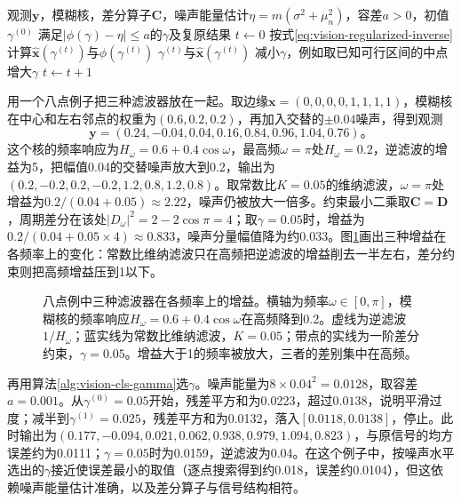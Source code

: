 \begin{algorithm}[约束最小二乘滤波的参数选择]
 \label{alg:vision-cls-gamma}
 \begin{algorithmic}[1]
  \Require 观测$\bm{y}$，模糊核，差分算子$\bm{C}$，噪声能量估计$\eta=m(\sigma^2+\mu_n^2)$，容差$a>0$，初值$\gamma^{(0)}$
  \Ensure 满足$|\phi(\gamma)-\eta|\leq a$的$\gamma$及复原结果
  \State $t\gets0$
  \Loop
   \State 按式\eqref{eq:vision-regularized-inverse}计算$\widehat{\bm{x}}(\gamma^{(t)})$与$\phi(\gamma^{(t)})$
    \State \Return $\gamma^{(t)}$与$\widehat{\bm{x}}(\gamma^{(t)})$
    \State 减小$\gamma$，例如取已知可行区间的中点 
   \Else
    \State 增大$\gamma$ 
   \EndIf
   \State $t\gets t+1$
  \EndLoop
 \end{algorithmic}
\end{algorithm}

用一个八点例子把三种滤波器放在一起。取边缘$\bm{x}=(0,0,0,0,1,1,1,1)$，模糊核在中心和左右邻点的权重为$(0.6,0.2,0.2)$，再加入交替的$\pm0.04$噪声，得到观测
\[
 \bm{y}=(0.24,-0.04,0.04,0.16,0.84,0.96,1.04,0.76)\text{。}
\]
这个核的频率响应为$H_\omega=0.6+0.4\cos\omega$，最高频$\omega=\pi$处$H_\omega=0.2$，逆滤波的增益为5，把幅值0.04的交替噪声放大到0.2，输出为$(0.2,-0.2,0.2,-0.2,1.2,0.8,1.2,0.8)$。取常数比$K=0.05$的维纳滤波，$\omega=\pi$处增益为$0.2/(0.04+0.05)\approx2.22$，噪声仍被放大一倍多。约束最小二乘取$\bm{C}=\bm{D}$，周期差分在该处$|D_\omega|^2=2-2\cos\pi=4$；取$\gamma=0.05$时，增益为$0.2/(0.04+0.05\times4)\approx0.833$，噪声分量幅值降为约0.033。图\ref{fig:vision-filter-gains}画出三种增益在各频率上的变化：常数比维纳滤波只在高频把逆滤波的增益削去一半左右，差分约束则把高频增益压到1以下。

\begin{figure}[htbp]
 \centering
 
 \caption{八点例中三种滤波器在各频率上的增益。横轴为频率$\omega\in[0,\pi]$，模糊核的频率响应$H_\omega=0.6+0.4\cos\omega$在高频降到0.2。虚线为逆滤波$1/H_\omega$；蓝实线为常数比维纳滤波，$K=0.05$；带点的实线为一阶差分约束，$\gamma=0.05$。增益大于1的频率被放大，三者的差别集中在高频。}
 \label{fig:vision-filter-gains}
\end{figure}

再用算法\ref{alg:vision-cls-gamma}选$\gamma$。噪声能量为$8\times0.04^2=0.0128$，取容差$a=0.001$。从$\gamma^{(0)}=0.05$开始，残差平方和为0.0223，超过$0.0138$，说明平滑过度；减半到$\gamma^{(1)}=0.025$，残差平方和为0.0132，落入$[0.0118,0.0138]$，停止。此时输出为$(0.177,-0.094,0.021,0.062,0.938,0.979,1.094,0.823)$，与原信号的均方误差约为0.0111；$\gamma=0.05$时为0.0159，逆滤波为0.04。在这个例子中，按噪声水平选出的$\gamma$接近使误差最小的取值（逐点搜索得到约0.018，误差约0.0104），但这依赖噪声能量估计准确，以及差分算子与信号结构相符。

